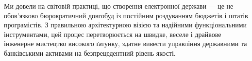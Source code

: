 Ми довели на світовій практиці, що створення електронної держави — це не обов'язково бюрократичний довгобуд із постійним роздуванням бюджетів і штатів програмістів. З правильною архітектурною візією та надійними функціональними інструментами, цей процес перетворюється на швидке, веселе і драйвове інженерне мистецтво високого ґатунку, здатне вивести управління державними та банківськими активами на безпрецедентний рівень якості.

